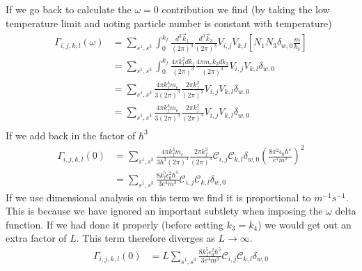 If we go back to calculate the
\(\omega = 0\) contribution
we find (by taking the low
temperature limit and noting
particle number is constant
with temperature)
\begin{align}
    \Gamma_{i,j, k,l}(\omega) & =
    \sum_{s^1,s^3} \int_0^{k_f}
    \frac{d^3\vec{k}_1}{{(2\pi)}^3}
    \frac{d^3\vec{k}_3}{{(2\pi)}^3}
    V_{i,j} V_{k,l} [
    N_1 N_3 \delta_{w, 0} \frac{m}{k_3}] \\
                              & =
    \sum_{s^1,s^3} \int_0^{k_f}
    \frac{4\pi k_1^2 dk_1}{{(2\pi)}^3}
    \frac{4 \pi m_e k_3 dk_3}{{(2\pi)}^3}
    V_{i,j} V_{k,l} \delta_{w, 0}        \\
                              & =
    \sum_{s^1,s^3} \frac{4\pi k_f^3 m_e}{3{(2\pi)}^3}
    \frac{2 \pi k_f^2}{{(2\pi)}^3}
    V_{i,j} V_{k,l} \delta_{w, 0}        \\
                              & =
    \sum_{s^1,s^3} \frac{4\pi k_f^3 m_e}{3{(2\pi)}^3}
    \frac{2 \pi k_f^2}{{(2\pi)}^3}
    V_{i,j} V_{k,l} \delta_{w, 0}        \\
\end{align}
If we add back in the factor of  \(\hbar^3\)
\begin{align}
    \Gamma_{i,j, k,l}(0) & =
    \sum_{s^1,s^3} \frac{4\pi k_f^3 m_e}{3\hbar^3{(2\pi)}^3}
    \frac{2 \pi k_f^2}{{(2\pi)}^3}
    \mathcal{C}_{i,j} \mathcal{C}_{k,l}
    \delta_{w, 0} {(\frac{8 \pi^2 \epsilon_0 \hbar^4}{e^2 m^2})}^2 \\
                         & =
    \sum_{s^1,s^3}
    \frac{8k_f^5 \epsilon_0^2 \hbar^5}{3e^4 m^3}
    \mathcal{C}_{i,j} \mathcal{C}_{k,l} \delta_{w, 0}
\end{align}
If we use dimensional analysis on this term
we find it is proportional to \(m^{-1}s^{-1}\).
This is because we have ignored an important
subtlety when imposing the \(\omega \) delta
function. If we had done it properly (before
setting \(k_3 = k_4\)) we would get
out an extra factor of \(L\). This term
therefore diverges as \(L \rightarrow \infty \).
\begin{align}
    \Gamma_{i,j, k,l}(0) & =
    L \sum_{s^1,s^3}
    \frac{8k_f^5 \epsilon_0^2 \hbar^5}{3e^4 m^3}
    \mathcal{C}_{i,j} \mathcal{C}_{k,l} \delta_{w, 0}
    \label{eqn:divergent expression for first integral}
\end{align}